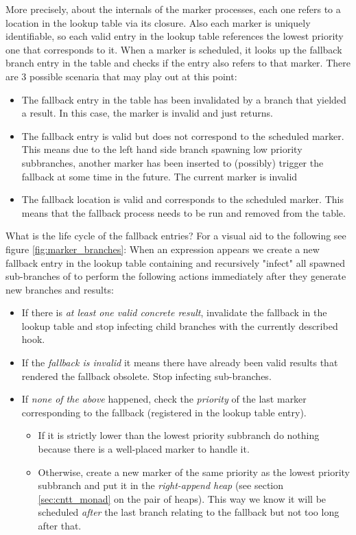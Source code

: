 More precisely, about the internals of the marker processes, each one
refers to a location in the lookup table via its closure. Also each
marker is uniquely identifiable, so each valid entry in the lookup
table references the lowest priority one that corresponds
to it. When a marker is scheduled, it looks up the fallback branch
entry in the table and checks if the entry also refers to that
marker. There are 3 possible scenaria that may play out at this point:

\begin{itemize}
\item The fallback entry in the table has been invalidated by a branch
  that yielded a result. In this case, the marker is invalid and just
  returns.
\item The fallback entry is valid but does not correspond to the
  scheduled marker. This means due to the left hand side branch
  spawning low priority subbranches, another marker has been inserted
  to (possibly) trigger the fallback at some time in the future. The
  current marker is invalid
\item The fallback location is valid and corresponds to the scheduled
  marker. This means that the fallback process needs to be run
  and removed from the table.
\end{itemize}

What is the life cycle of the fallback entries? For a visual aid to the
following see figure \ref{fig:marker_branches}: When an expression
 appears we create a new fallback entry in the lookup
table containing  and recursively "infect" all spawned
sub-branches of  to perform the following actions immediately
after they generate new branches and results:

\begin{itemize}
\item If there is \emph{at least one valid concrete result}, invalidate the
  fallback in the lookup table and stop infecting child branches with
  the currently described hook.
\item If the \emph{fallback is invalid} it means there have already been
  valid results that rendered the fallback obsolete. Stop infecting
  sub-branches.
\item If \emph{none of the above} happened, check the \emph{priority} of the
  last marker corresponding to the fallback (registered in the lookup
  table entry).

  \begin{itemize}
  \item If it is strictly lower than the lowest priority
    subbranch do nothing because there is a well-placed marker to handle
    it.
  \item Otherwise, create a new marker of the same priority as the
    lowest priority subbranch and put it in the \emph{right-append
    heap} (see section \ref{sec:cntt_monad} on the pair of
    heaps). This way we know it will be scheduled \emph{after} the
    last branch relating to the fallback but not too long after that.
  \end{itemize}


\end{itemize}

